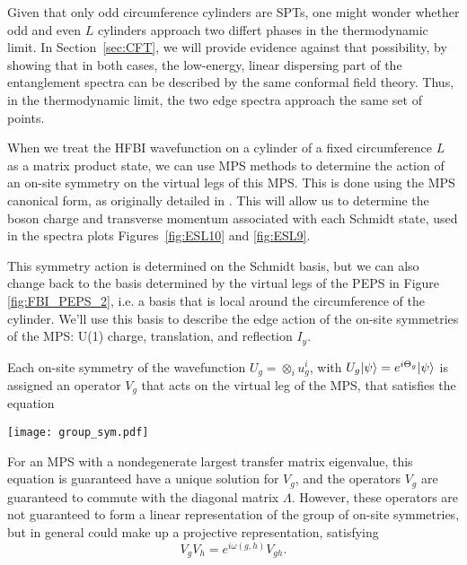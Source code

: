 Given that only odd circumference cylinders are SPTs, one might wonder whether
odd and even $L$ cylinders approach two differt phases in the thermodynamic
limit. In Section~\ref{sec:CFT}, we will provide evidence against that
possibility, by showing that in both cases, the low-energy, linear dispersing
part of the entanglement spectra can be described by the same conformal field
theory. Thus, in the thermodynamic limit, the two edge spectra approach the
same set of points.

When we treat the HFBI wavefunction on a
cylinder of a fixed circumference $L$ as a matrix product state, we can use
MPS methods to determine the action of an on-site symmetry on
the virtual legs of this MPS. This is done using the MPS canonical form, as
originally detailed in \cite{perezgarcia2008}. This will allow us to determine
the boson charge and transverse momentum associated with each Schmidt state,
used in the spectra plots Figures~\ref{fig:ESL10} and \ref{fig:ESL9}.

This symmetry action is determined on the Schmidt basis, but we can also
change back to the basis determined by the virtual legs of the PEPS in Figure
\ref{fig:FBI_PEPS_2}, i.e. a basis that is local around the circumference of
the cylinder. We'll use this basis to describe the edge action of the on-site
symmetries of the MPS: U(1) charge, translation, and reflection $I_y$.

Each on-site symmetry of the wavefunction $U_g = \otimes_i u^i_g$, with $U_g
\vert \psi \rangle = e^{i \Theta_g} \vert \psi \rangle$ is assigned an operator $V_g$ that
acts on the virtual leg of the MPS, that satisfies the equation
\begin{center}
\texttt{[image: group\_sym.pdf]}
\end{center}

For an MPS with a nondegenerate largest
transfer matrix eigenvalue, this equation is guaranteed have a unique solution
for $V_g$, and the operators $V_g$ are guaranteed to commute with the diagonal
matrix $\Lambda$. However, these operators are not guaranteed to form a linear
representation of the group of on-site symmetries, but in general could make
up a projective representation, satisfying
$$V_g V_h = e^{i \omega(g, h)} V_{gh}.$$





